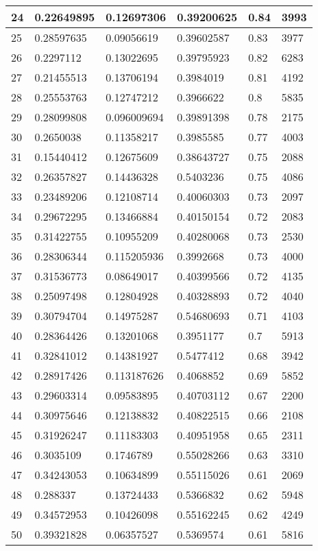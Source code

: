 \begin{longtable}{|l|l|l|l|l|l|}
24 & 0.22649895 & 0.12697306 & 0.39200625 & 0.84 & 3993 \\ \hline 
25 & 0.28597635 & 0.09056619 & 0.39602587 & 0.83 & 3977 \\ \hline 
26 & 0.2297112 & 0.13022695 & 0.39795923 & 0.82 & 6283 \\ \hline 
27 & 0.21455513 & 0.13706194 & 0.3984019 & 0.81 & 4192 \\ \hline 
28 & 0.25553763 & 0.12747212 & 0.3966622 & 0.8 & 5835 \\ \hline 
29 & 0.28099808 & 0.096009694 & 0.39891398 & 0.78 & 2175 \\ \hline 
30 & 0.2650038 & 0.11358217 & 0.3985585 & 0.77 & 4003 \\ \hline 
31 & 0.15440412 & 0.12675609 & 0.38643727 & 0.75 & 2088 \\ \hline 
32 & 0.26357827 & 0.14436328 & 0.5403236 & 0.75 & 4086 \\ \hline 
33 & 0.23489206 & 0.12108714 & 0.40060303 & 0.73 & 2097 \\ \hline 
34 & 0.29672295 & 0.13466884 & 0.40150154 & 0.72 & 2083 \\ \hline 
35 & 0.31422755 & 0.10955209 & 0.40280068 & 0.73 & 2530 \\ \hline 
36 & 0.28306344 & 0.115205936 & 0.3992668 & 0.73 & 4000 \\ \hline 
37 & 0.31536773 & 0.08649017 & 0.40399566 & 0.72 & 4135 \\ \hline 
38 & 0.25097498 & 0.12804928 & 0.40328893 & 0.72 & 4040 \\ \hline 
39 & 0.30794704 & 0.14975287 & 0.54680693 & 0.71 & 4103 \\ \hline 
40 & 0.28364426 & 0.13201068 & 0.3951177 & 0.7 & 5913 \\ \hline 
41 & 0.32841012 & 0.14381927 & 0.5477412 & 0.68 & 3942 \\ \hline 
42 & 0.28917426 & 0.113187626 & 0.4068852 & 0.69 & 5852 \\ \hline 
43 & 0.29603314 & 0.09583895 & 0.40703112 & 0.67 & 2200 \\ \hline 
44 & 0.30975646 & 0.12138832 & 0.40822515 & 0.66 & 2108 \\ \hline 
45 & 0.31926247 & 0.11183303 & 0.40951958 & 0.65 & 2311 \\ \hline 
46 & 0.3035109 & 0.1746789 & 0.55028266 & 0.63 & 3310 \\ \hline 
47 & 0.34243053 & 0.10634899 & 0.55115026 & 0.61 & 2069 \\ \hline 
48 & 0.288337 & 0.13724433 & 0.5366832 & 0.62 & 5948 \\ \hline 
49 & 0.34572953 & 0.10426098 & 0.55162245 & 0.62 & 4249 \\ \hline 
50 & 0.39321828 & 0.06357527 & 0.5369574 & 0.61 & 5816 \\ \hline 
\end{longtable}